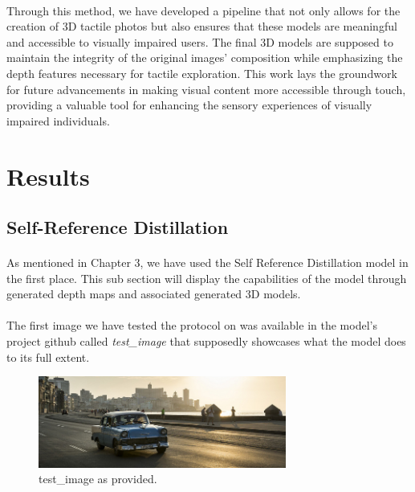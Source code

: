 \documentclass[12pt, letterpaper]{article}
\begin{document}
\begin{spacing}{1.15}
\paragraph{}
Through this method, we have developed a pipeline that not only allows for the creation of 3D tactile photos but also ensures that these models are meaningful and accessible to visually
impaired users. The final 3D models are supposed to maintain the integrity of the original images' composition while emphasizing the depth features necessary for tactile exploration.
This work lays the groundwork for future advancements in making visual content more accessible through touch, providing a valuable tool for enhancing the sensory experiences of visually impaired individuals.

\newpage

\section{Results}
\subsection{Self-Reference Distillation}

\paragraph{}
As mentioned in Chapter 3, we have used the Self Reference Distillation model in the first place. This sub section will display the capabilities of the model through generated depth maps
and associated generated 3D models.

\paragraph{}
The first image we have tested the protocol on was available in the model's project github called \emph{test\_image} that supposedly showcases what the model does to its
full extent.

\begin{figure}[!ht]
    \begin{center}
        \includegraphics[height = 3cm]{test_image}
        \caption{test\_image as provided.}
        \label{testimg}
    \end{center}
\end{figure}


\end{spacing}
\end{document}
